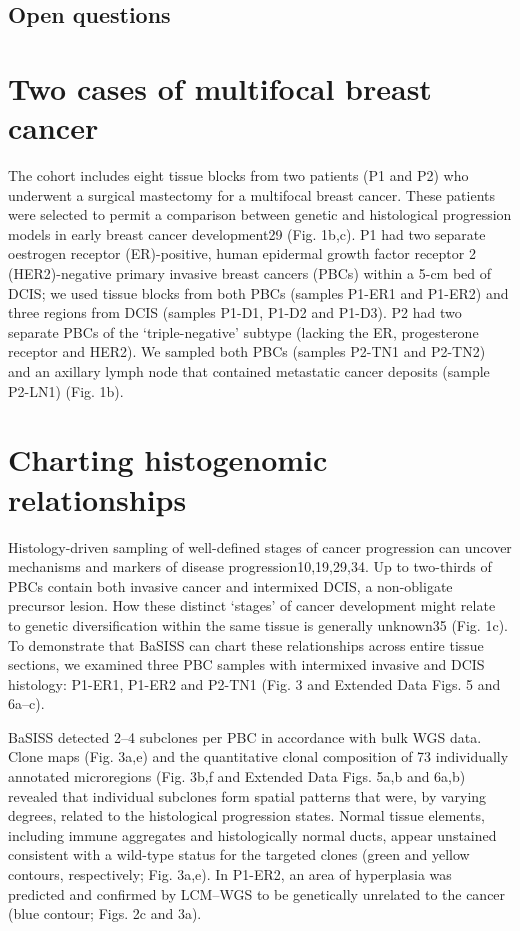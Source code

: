 \subsection{Open questions}

\section{Two cases of multifocal breast cancer}

The cohort includes eight tissue blocks from two patients (P1 and P2) who underwent a surgical mastectomy for a multifocal breast cancer. These patients were selected to permit a comparison between genetic and histological progression models in early breast cancer development29 (Fig. 1b,c). P1 had two separate oestrogen receptor (ER)-positive, human epidermal growth factor receptor 2 (HER2)-negative primary invasive breast cancers (PBCs) within a 5-cm bed of DCIS; we used tissue blocks from both PBCs (samples P1-ER1 and P1-ER2) and three regions from DCIS (samples P1-D1, P1-D2 and P1-D3). P2 had two separate PBCs of the ‘triple-negative’ subtype (lacking the ER, progesterone receptor and HER2). We sampled both PBCs (samples P2-TN1 and P2-TN2) and an axillary lymph node that contained metastatic cancer deposits (sample P2-LN1) (Fig. 1b).

\section{Charting histogenomic relationships}

Histology-driven sampling of well-defined stages of cancer progression can uncover mechanisms and markers of disease progression10,19,29,34. Up to two-thirds of PBCs contain both invasive cancer and intermixed DCIS, a non-obligate precursor lesion. How these distinct ‘stages’ of cancer development might relate to genetic diversification within the same tissue is generally unknown35 (Fig. 1c). To demonstrate that BaSISS can chart these relationships across entire tissue sections, we examined three PBC samples with intermixed invasive and DCIS histology: P1-ER1, P1-ER2 and P2-TN1 (Fig. 3 and Extended Data Figs. 5 and 6a–c).

BaSISS detected 2–4 subclones per PBC in accordance with bulk WGS data. Clone maps (Fig. 3a,e) and the quantitative clonal composition of 73 individually annotated microregions (Fig. 3b,f and Extended Data Figs. 5a,b and 6a,b) revealed that individual subclones form spatial patterns that were, by varying degrees, related to the histological progression states. Normal tissue elements, including immune aggregates and histologically normal ducts, appear unstained consistent with a wild-type status for the targeted clones (green and yellow contours, respectively; Fig. 3a,e). In P1-ER2, an area of hyperplasia was predicted and confirmed by LCM–WGS to be genetically unrelated to the cancer (blue contour; Figs. 2c and 3a).

